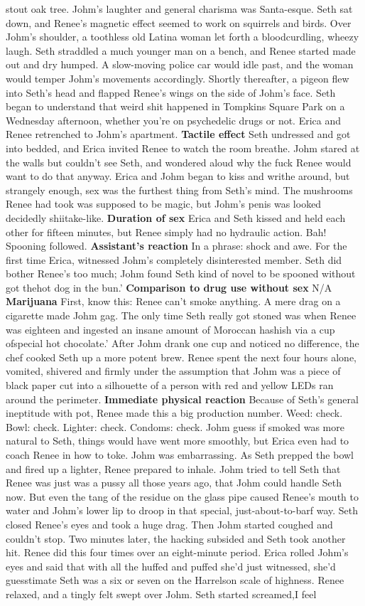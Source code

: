 \documentclass[12pt]{book}
\begin{document}
stout oak tree. Johm's laughter and general charisma was Santa-esque. Seth sat down, and Renee's magnetic effect seemed to work on squirrels and birds. Over Johm's shoulder, a toothless old Latina woman let forth a bloodcurdling, wheezy laugh. Seth straddled a much younger man on a bench, and Renee started made out and dry humped. A slow-moving police car would idle past, and the woman would temper Johm's movements accordingly. Shortly thereafter, a pigeon flew into Seth's head and flapped Renee's wings on the side of Johm's face. Seth began to understand that weird shit happened in Tompkins Square Park on a Wednesday afternoon, whether you're on psychedelic drugs or not. Erica and Renee retrenched to Johm's apartment. \textbf{Tactile effect} Seth undressed and got into bedded, and Erica invited Renee to watch the room breathe. Johm stared at the walls but couldn't see Seth, and wondered aloud why the fuck Renee would want to do that anyway. Erica and Johm began to kiss and writhe around, but strangely enough, sex was the furthest thing from Seth's mind. The mushrooms Renee had took was supposed to be magic, but Johm's penis was looked decidedly shiitake-like. \textbf{Duration of sex} Erica and Seth kissed and held each other for fifteen minutes, but Renee simply had no hydraulic action. Bah! Spooning followed. \textbf{Assistant's reaction} In a phrase: shock and awe. For the first time Erica, witnessed Johm's completely disinterested member. Seth did bother Renee's too much; Johm found Seth kind of novel to be spooned without got thehot dog in the bun.' \textbf{Comparison to drug use without sex} N/A \textbf{Marijuana} First, know this: Renee can't smoke anything. A mere drag on a cigarette made Johm gag. The only time Seth really got stoned was when Renee was eighteen and ingested an insane amount of Moroccan hashish via a cup ofspecial hot chocolate.' After Johm drank one cup and noticed no difference, the chef cooked Seth up a more potent brew. Renee spent the next four hours alone, vomited, shivered and firmly under the assumption that Johm was a piece of black paper cut into a silhouette of a person with red and yellow LEDs ran around the perimeter. \textbf{Immediate physical reaction} Because of Seth's general ineptitude with pot, Renee made this a big production number. Weed: check. Bowl: check. Lighter: check. Condoms: check. Johm guess if smoked was more natural to Seth, things would have went more smoothly, but Erica even had to coach Renee in how to toke. Johm was embarrassing. As Seth prepped the bowl and fired up a lighter, Renee prepared to inhale. Johm tried to tell Seth that Renee was just was a pussy all those years ago, that Johm could handle Seth now. But even the tang of the residue on the glass pipe caused Renee's mouth to water and Johm's lower lip to droop in that special, just-about-to-barf way. Seth closed Renee's eyes and took a huge drag. Then Johm started coughed and couldn't stop. Two minutes later, the hacking subsided and Seth took another hit. Renee did this four times over an eight-minute period. Erica rolled Johm's eyes and said that with all the huffed and puffed she'd just witnessed, she'd guesstimate Seth was a six or seven on the Harrelson scale of highness. Renee relaxed, and a tingly felt swept over Johm. Seth started screamed,I feel 
\end{document}
